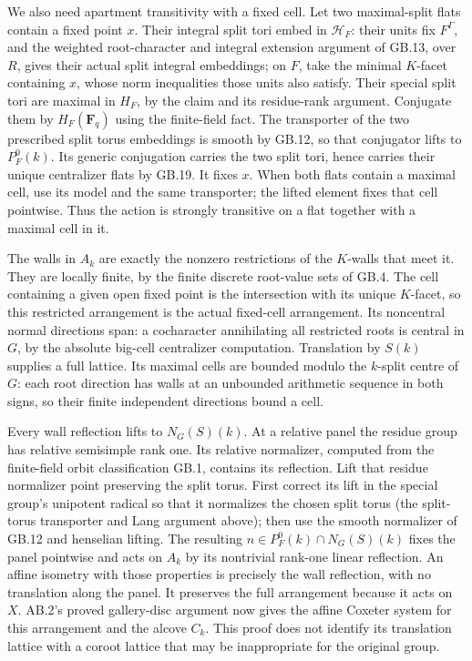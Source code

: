 \documentclass[
  11pt,
]{article}
\begin{document}
We also need apartment transitivity with a fixed cell. Let two
maximal-split flats contain a fixed point \(x\). Their integral split
tori embed in \(\mathcal H_F\): their units fix \(F^\Gamma\), and the
weighted root-character and integral extension argument of GB.13, over
\(R\), gives their actual split integral embeddings; on \(F\), take the
minimal \(K\)-facet containing \(x\), whose norm inequalities those
units also satisfy. Their special split tori are maximal in \(H_F\), by
the claim and its residue-rank argument. Conjugate them by
\(H_F(\mathbf F_q)\) using the finite-field fact. The transporter of the
two prescribed split torus embeddings is smooth by GB.12, so that
conjugator lifts to \(P_F^0(k)\). Its generic conjugation carries the
two split tori, hence carries their unique centralizer flats by GB.19.
It fixes \(x\). When both flats contain a maximal cell, use its model
and the same transporter; the lifted element fixes that cell pointwise.
Thus the action is strongly transitive on a flat together with a maximal
cell in it.

The walls in \(A_k\) are exactly the nonzero restrictions of the
\(K\)-walls that meet it. They are locally finite, by the finite
discrete root-value sets of GB.4. The cell containing a given open fixed
point is the intersection with its unique \(K\)-facet, so this
restricted arrangement is the actual fixed-cell arrangement. Its
noncentral normal directions span: a cocharacter annihilating all
restricted roots is central in \(G\), by the absolute big-cell
centralizer computation. Translation by \(S(k)\) supplies a full
lattice. Its maximal cells are bounded modulo the \(k\)-split centre of
\(G\): each root direction has walls at an unbounded arithmetic sequence
in both signs, so their finite independent directions bound a cell.

Every wall reflection lifts to \(N_G(S)(k)\). At a relative panel the
residue group has relative semisimple rank one. Its relative normalizer,
computed from the finite-field orbit classification GB.1, contains its
reflection. Lift that residue normalizer point preserving the split
torus. First correct its lift in the special group's unipotent radical
so that it normalizes the chosen split torus (the split-torus
transporter and Lang argument above); then use the smooth normalizer of
GB.12 and henselian lifting. The resulting
\(n\in P_F^0(k)\cap N_G(S)(k)\) fixes the panel pointwise and acts on
\(A_k\) by its nontrivial rank-one linear reflection. An affine isometry
with those properties is precisely the wall reflection, with no
translation along the panel. It preserves the full arrangement because
it acts on \(X\). AB.2's proved gallery-disc argument now gives the
affine Coxeter system for this arrangement and the alcove \(C_k\). This
proof does not identify its translation lattice with a coroot lattice
that may be inappropriate for the original group.
\end{document}
